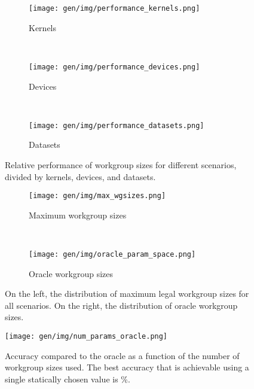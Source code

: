 \begin{figure}
\begin{subfigure}[t]{0.32\textwidth}
\centering
\texttt{[image: gen/img/performance\_kernels.png]}
\vspace{-1.5em} %
\caption{Kernels}
\label{fig:performance-kernels}
\end{subfigure}
~%
\begin{subfigure}[t]{0.32\textwidth}
\centering
\texttt{[image: gen/img/performance\_devices.png]}
\vspace{-1.5em} %
\caption{Devices}
\label{fig:performance-devices}
\end{subfigure}
~%
\begin{subfigure}[t]{0.32\textwidth}
\centering
\texttt{[image: gen/img/performance\_datasets.png]}
\vspace{-1.5em} %
\caption{Datasets}
\label{fig:performance-datasets}
\end{subfigure}
\label{fig:performance}
\caption{%
  Relative performance of workgroup sizes for different
  scenarios, divided by kernels, devices, and datasets.%
}
\end{figure}

\begin{figure}
\begin{subfigure}[t]{0.45\textwidth}
\centering
\texttt{[image: gen/img/max\_wgsizes.png]}
\vspace{-1.5em} %
\caption{Maximum workgroup sizes}
\label{fig:max-wgsizes}
\end{subfigure}
~%
\begin{subfigure}[t]{0.45\textwidth}
\centering
\texttt{[image: gen/img/oracle\_param\_space.png]}
\vspace{-1.5em} %
\caption{Oracle workgroup sizes}
\label{fig:oracle-wgsizes}
\end{subfigure}
\caption{%
  On the left, the distribution of maximum legal workgroup sizes for
  all scenarios. On the right, the distribution of oracle workgroup
  sizes.%
}
\label{fig:heatmaps}
\end{figure}

\begin{figure}
\centering
\texttt{[image: gen/img/num\_params\_oracle.png]}
\caption{%
  Accuracy compared to the oracle as a function of the number of
  workgroup sizes used. The best accuracy that is achievable using a
  single statically chosen value is
  \protect\%.%
}
\label{fig:oracle-accuracy}
\end{figure}


